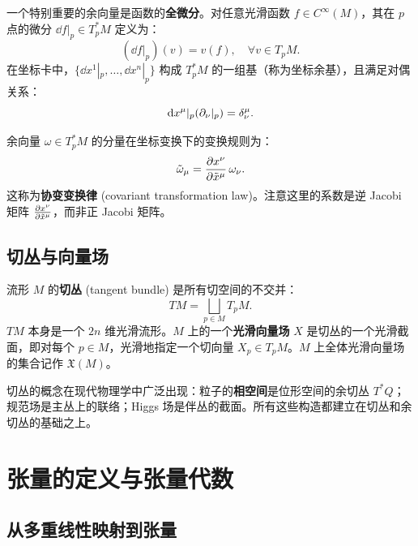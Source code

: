 一个特别重要的余向量是函数的\textbf{全微分}。对任意光滑函数 $f \in C^\infty(M)$，其在 $p$ 点的微分 $\dd f|_p \in T_p^*M$ 定义为：
\begin{equation}
    (\dd f|_p)(v) = v(f), \quad \forall v \in T_pM.
\end{equation}
在坐标卡中，$\{\dd x^1|_p, \ldots, \dd x^n|_p\}$ 构成 $T_p^*M$ 的一组基（称为坐标余基），且满足对偶关系：
\begin{equation}
    \dd x^\mu|_p (\partial_\nu|_p) = \delta^\mu_\nu.
\end{equation}

\begin{property}[余向量的坐标变换]
余向量 $\omega \in T_p^*M$ 的分量在坐标变换下的变换规则为：
\begin{equation}
    \tilde{\omega}_\mu = \frac{\partial x^\nu}{\partial \tilde{x}^\mu} \, \omega_\nu.
\end{equation}
这称为\textbf{协变变换律} (covariant transformation law)。注意这里的系数是逆 Jacobi 矩阵 $\frac{\partial x^\nu}{\partial \tilde{x}^\mu}$，而非正 Jacobi 矩阵。
\end{property}

\subsection{切丛与向量场}

\begin{definition}[切丛与向量场]
流形 $M$ 的\textbf{切丛} (tangent bundle) 是所有切空间的不交并：
\begin{equation}
    TM = \bigsqcup_{p \in M} T_pM.
\end{equation}
$TM$ 本身是一个 $2n$ 维光滑流形。$M$ 上的一个\textbf{光滑向量场} $X$ 是切丛的一个光滑截面，即对每个 $p \in M$，光滑地指定一个切向量 $X_p \in T_pM$。$M$ 上全体光滑向量场的集合记作 $\mathfrak{X}(M)$。
\end{definition}

\begin{remark}
切丛的概念在现代物理学中广泛出现：粒子的\textbf{相空间}是位形空间的余切丛 $T^*Q$；规范场是主丛上的联络；Higgs 场是伴丛的截面。所有这些构造都建立在切丛和余切丛的基础之上。
\end{remark}

\section{张量的定义与张量代数}

\subsection{从多重线性映射到张量}

